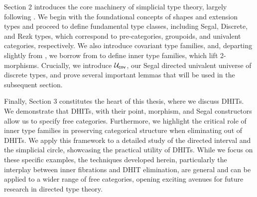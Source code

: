 \documentclass[main.tex]{subfiles}
\begin{document}
Section 2 introduces the core machinery of simplicial type theory, largely following \cite{riehl_type_2017}. We begin with the foundational concepts of shapes and extension types and proceed to define fundamental type classes, including Segal, Discrete, and Rezk types, which correspond to pre-categories, groupoids, and univalent categories, respectively. We also introduce covariant type families, and, departing slightly from \cite{riehl_type_2017}, we borrow from \cite{buchholtz_synthetic_2022} to define inner type families, which lift 2-morphisms. Crucially, we introduce $\mathcal{U}_\mathsf{cov}$, our Segal directed univalent universe of discrete types, and prove several important lemmas that will be used in the subsequent section. 

Finally, Section 3 constitutes the heart of this thesis, where we discuss DHITs. We demonstrate that DHITs, with their point, morphism, and Segal constructors allow us to specify free categories. Furthermore, we highlight the critical role of inner type families in preserving categorical structure when eliminating out of DHITs. We apply this framework to a detailed study of the directed interval and the simplicial circle, showcasing the practical utility of DHITs. While we focus on these specific examples, the techniques developed herein, particularly the interplay between inner fibrations and DHIT elimination, are general and can be applied to a wider range of free categories, opening exciting avenues for future research in directed type theory.
\end{document}
